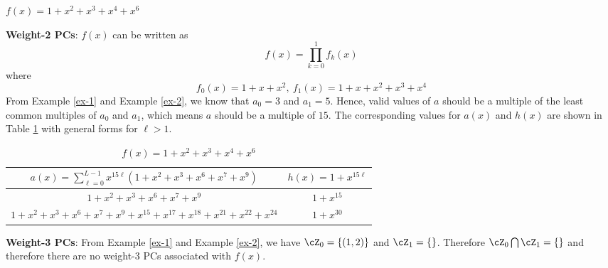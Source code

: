 \begin{example}
$f(x)=1+x^2+x^3+x^4+x^6$\newline

\textbf{Weight-2 PCs}: $f(x)$ can be written as 
$$f(x)=\prod_{k=0}^{1}f_k(x)$$
where 
$$f_0(x)=1+x+x^2,~f_1(x)=1+x+x^2+x^3+x^4$$ 
From Example \ref{ex-1} and Example \ref{ex-2}, we know that $a_0=3$ and $a_1=5$.
Hence, valid values of $a$ should be a multiple of the least common multiples of $a_0$ and $a_1$, which means $a$ should be a multiple of $15$.
The corresponding values for $a(x)$ and $h(x)$ are shown in Table \ref{novelTab1-c} with general forms for $\ell>1$.

\begin{table}[htbp]
\renewcommand{\arraystretch}{1.3}
 \caption{$f(x)=1+x^2+x^3+x^4+x^6$}
 \centering
\begin{tabular}{c c } 
\hline
 $a(x)=\sum_{\ell=0}^{L-1} x^{15\ell}(1+x^2+x^3+x^6+x^7+x^9)$ & $h(x)=1+x^{15\ell}$ \\ [0.5ex] 
\hline\hline
$1+x^2+x^3+x^6+x^7+x^9$ & $1+x^{15}$\\ 
$1+x^2+x^3+x^6+x^7+x^9+x^{15}+x^{17}+x^{18}+x^{21}+x^{22}+x^{24}$ & $1+x^{30}$ \\
\end{tabular}
 \label{novelTab1-c}
\end{table}

\textbf{Weight-3 PCs}:
From Example \ref{ex-1} and Example \ref{ex-2}, we have $\cZ_0=\{ (1,2)\}$ and $\cZ_1=\{ \}$. Therefore $\cZ_0 \bigcap \cZ_1= \{ \}$ and therefore there are no weight-3 PCs associated with $f(x)$.
\end{example}
\newpage
